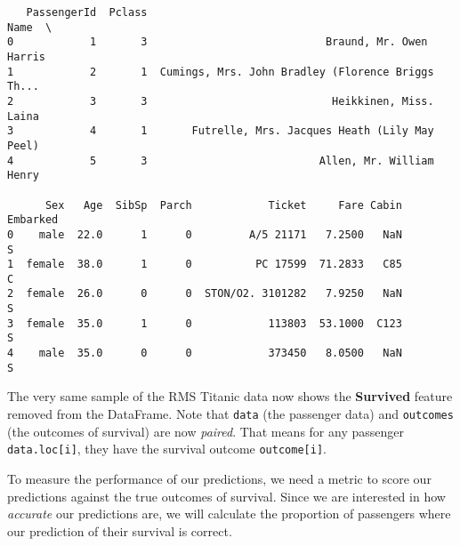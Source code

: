 \documentclass{article}
\begin{document}
    
    \begin{verbatim}
   PassengerId  Pclass                                               Name  \
0            1       3                            Braund, Mr. Owen Harris   
1            2       1  Cumings, Mrs. John Bradley (Florence Briggs Th...   
2            3       3                             Heikkinen, Miss. Laina   
3            4       1       Futrelle, Mrs. Jacques Heath (Lily May Peel)   
4            5       3                           Allen, Mr. William Henry   

      Sex   Age  SibSp  Parch            Ticket     Fare Cabin Embarked  
0    male  22.0      1      0         A/5 21171   7.2500   NaN        S  
1  female  38.0      1      0          PC 17599  71.2833   C85        C  
2  female  26.0      0      0  STON/O2. 3101282   7.9250   NaN        S  
3  female  35.0      1      0            113803  53.1000  C123        S  
4    male  35.0      0      0            373450   8.0500   NaN        S  
    \end{verbatim}

    
    The very same sample of the RMS Titanic data now shows the
\textbf{Survived} feature removed from the DataFrame. Note that
\texttt{data} (the passenger data) and \texttt{outcomes} (the outcomes
of survival) are now \emph{paired}. That means for any passenger
\texttt{data.loc{[}i{]}}, they have the survival outcome
\texttt{outcome{[}i{]}}.

To measure the performance of our predictions, we need a metric to score
our predictions against the true outcomes of survival. Since we are
interested in how \emph{accurate} our predictions are, we will calculate
the proportion of passengers where our prediction of their survival is
correct.
\end{document}
